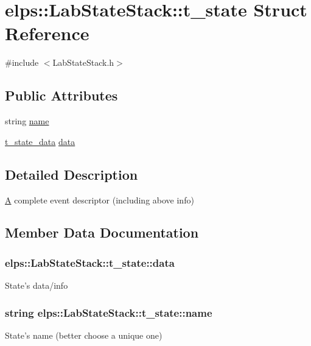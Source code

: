 \hypertarget{structelps_1_1_lab_state_stack_1_1t__state}{\section{elps\+:\+:Lab\+State\+Stack\+:\+:t\+\_\+state Struct Reference}
\label{structelps_1_1_lab_state_stack_1_1t__state}
}


{\ttfamily \#include $<$Lab\+State\+Stack.\+h$>$}

\subsection*{Public Attributes}
\begin{DoxyCompactItemize}
\item 
string \hyperlink{structelps_1_1_lab_state_stack_1_1t__state_ab77c61bbdda20cb379c73e1213b0f4f9}{name}
\item 
\hyperlink{structelps_1_1_lab_state_stack_1_1t__state__data}{t\+\_\+state\+\_\+data} \hyperlink{structelps_1_1_lab_state_stack_1_1t__state_ac05779e0c7a8446cf7962b54dc35218a}{data}
\end{DoxyCompactItemize}


\subsection{Detailed Description}
\hyperlink{class_a}{A} complete event descriptor (including above info) 

\subsection{Member Data Documentation}
\hypertarget{structelps_1_1_lab_state_stack_1_1t__state_ac05779e0c7a8446cf7962b54dc35218a}{
\subsubsection[{data}]{ elps\+::\+Lab\+State\+Stack\+::t\+\_\+state\+::data}}\label{structelps_1_1_lab_state_stack_1_1t__state_ac05779e0c7a8446cf7962b54dc35218a}
State's data/info \hypertarget{structelps_1_1_lab_state_stack_1_1t__state_ab77c61bbdda20cb379c73e1213b0f4f9}{
\subsubsection[{name}]{\setlength{\rightskip}{0pt plus 5cm}string elps\+::\+Lab\+State\+Stack\+::t\+\_\+state\+::name}}\label{structelps_1_1_lab_state_stack_1_1t__state_ab77c61bbdda20cb379c73e1213b0f4f9}
State's name (better choose a unique one) 
